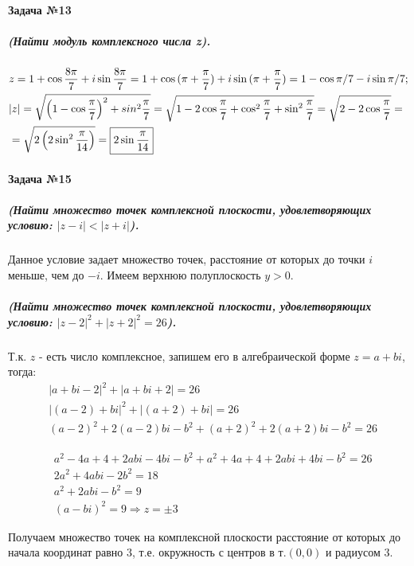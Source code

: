 \documentclass[a4paper,12pt]{report} %
\begin{document}
\paragraph{Задача №13}
\subparagraph{(Найти модуль комплексного числа z).}

\begin{align*}
	&z=1+\cos{\dfrac{8\pi}{7}}+i\sin{\dfrac{8\pi}{7}}=	
	1+\cos{(\pi+\dfrac{\pi}{7})}+i\sin{(\pi+\dfrac{\pi}{7})}=	
	1-\cos\pi/7-i\sin\pi/7;\\
	&|z|=\sqrt{\left(1-\cos{\dfrac{\pi}{7}}\right)^2+sin^2{\dfrac{\pi}{7}}}=
	\sqrt{1-2\cos{\dfrac{\pi}{7}}+
	\cos^2{\dfrac{\pi}{7}}+\sin^2\dfrac{\pi}{7}}=
	\sqrt{2-2\cos{\dfrac{\pi}{7}}}=\\
	&=\sqrt{2\left(2\sin^2{\dfrac{\pi}{14}}\right)}=
	\fbox{$ 2\sin{\dfrac{\pi}{14}} $}
\end{align*}
 
\paragraph{Задача №15}
\subparagraph{(Найти множество точек комплексной плоскости, удовлетворяющих условию: $ |z-i|<|z+i| $).} 
Данное условие задает множество точек, расстояние от которых 
до точки $ i $ меньше, чем до $ -i $. Имеем верхнюю полуплоскость $ y>0 $.

\subparagraph{(Найти множество точек комплексной плоскости, удовлетворяющих условию: $ |z-2|^2+|z+2|^2=26 $).\\}
Т.к. $ z $ - есть число комплексное, запишем его в алгебраической форме
$ z=a+bi $, тогда:
\begin{align*}
	&|a+bi-2|^2+|a+bi+2|=26\\
	&|(a-2)+bi|^2+|(a+2)+bi|=26\\	
	&(a-2)^2+2(a-2)bi-b^2+(a+2)^2+2(a+2)bi-b^2=26
\end{align*}


\begin{align*}
	&a^2-4a+4+2abi-4bi-b^2+a^2+4a+4+2abi+4bi-b^2=26\\
	&2a^2+4abi-2b^2=18\\
	&a^2+2abi-b^2=9\\
	&(a-bi)^2=9 \Rightarrow z=\pm 3
\end{align*}

Получаем множество точек на комплексной плоскости расстояние от которых до начала координат равно 3, т.е. окружность с центров в т.$ (0, 0) $ и радиусом 3.
\end{document}
